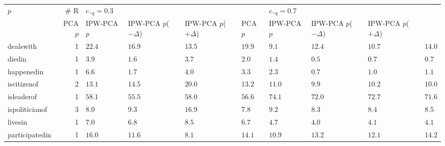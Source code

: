 \begin{tabular}{lr|llll|llll}
\toprule
           $p$ & \# R & \multicolumn{4}{l}{$c_{\neg q}=0.3$} & \multicolumn{4}{l}{$c_{\neg q}=0.7$} \\
               &          PCA $p$ & IPW-PCA $p$ & IPW-PCA $p$($-\Delta$) & IPW-PCA $p$($+\Delta$) &          PCA $p$ & IPW-PCA $p$ & IPW-PCA $p$($-\Delta$) & IPW-PCA $p$($+\Delta$) \\
\midrule
     dealswith &    1 &           $22.4$ & $\bm{16.9}$ &                 $13.5$ &                 $19.9$ &       $\bm{9.1}$ &      $12.4$ &                 $10.7$ &                 $14.0$ \\
        diedin &    1 &            $3.9$ &  $\bm{1.6}$ &                  $3.7$ &                  $2.0$ &            $1.4$ &  $\bm{0.5}$ &                  $0.7$ &                  $0.7$ \\
    happenedin &    1 &            $6.6$ &  $\bm{1.7}$ &                  $4.0$ &                  $3.3$ &            $2.3$ &  $\bm{0.7}$ &                  $1.0$ &                  $1.1$ \\
   iscitizenof &    2 &      $\bm{13.1}$ &      $14.5$ &                 $20.0$ &                 $13.2$ &           $11.0$ &  $\bm{9.9}$ &                 $10.2$ &                 $10.0$ \\
    isleaderof &    1 &           $58.1$ & $\bm{55.5}$ &                 $58.0$ &                 $56.6$ &           $74.1$ & $\bm{72.0}$ &                 $72.7$ &                 $71.6$ \\
ispoliticianof &    3 &       $\bm{8.0}$ &       $9.3$ &                 $16.9$ &                  $7.8$ &            $9.2$ &  $\bm{8.3}$ &                  $8.4$ &                  $8.5$ \\
       livesin &    1 &            $7.0$ &  $\bm{6.8}$ &                  $8.5$ &                  $6.7$ &            $4.7$ &  $\bm{4.0}$ &                  $4.1$ &                  $4.1$ \\
participatedin &    1 &           $16.0$ & $\bm{11.6}$ &                  $8.1$ &                 $14.1$ &      $\bm{10.9}$ &      $13.2$ &                 $12.1$ &                 $14.2$ \\
\bottomrule
\end{tabular}
